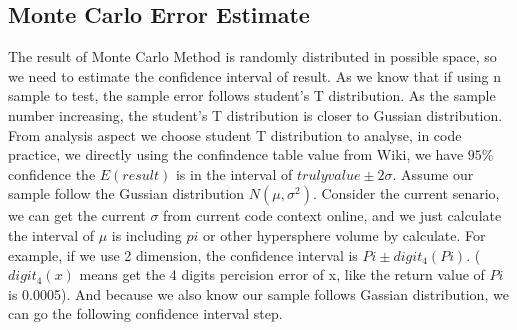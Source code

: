 \documentclass{article}
\begin{document}
		\subsection*{Monte Carlo Error Estimate}
		The result of Monte Carlo Method is randomly distributed in possible space, so we need to estimate the confidence interval of result. As we know that if using n sample to test, the sample error follows student's T distribution. As the sample number increasing, the student's T distribution is closer to Gussian distribution. From analysis aspect we choose student T distribution to analyse, in code practice, we directly using the confindence table value from Wiki, we have $95\%$ confidence the $E(result)$ is in the interval of $truly value \pm 2 \sigma$. Assume our sample follow the Gussian distribution $N(\mu, \sigma^2)$. Consider the current senario, we can get the current $\sigma$ from current code context online, and we just calculate the interval of $\mu$ is including $pi$ or other hypersphere volume by calculate. For example, if we use 2 dimension, the confidence interval is $Pi \pm digit_4(Pi)$. ($digit_4(x)$ means get the 4 digits percision error of x, like the return value of $Pi$ is 0.0005). And because we also know our sample follows Gassian distribution, we can go the following confidence interval step.
		\\
		\\
\end{document}
